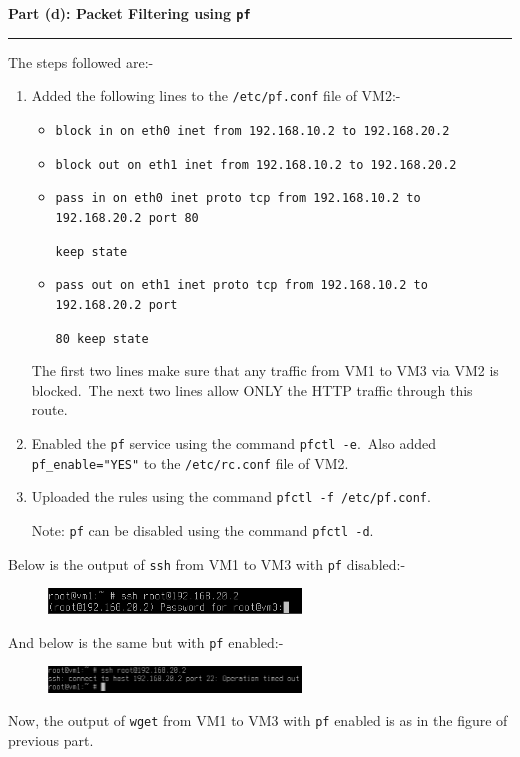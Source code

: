 \documentclass[a4paper,12pt]{article}
\newenvironment{solution}[2][]{%
\begin{mdframed}[linecolor=blue!70!black, linewidth=2pt, roundcorner=10pt, backgroundcolor=yellow!10!white, skipabove=12pt, skipbelow=12pt]%
	\textbf{\large #2}
	\par\noindent\rule{\textwidth}{0.4pt}
}{
\end{mdframed}
}
\begin{document}
\begin{solution}{Part (d): Packet Filtering using \texttt{pf}}
    The steps followed are:-
    \begin{enumerate}
        \item Added the following lines to the \texttt{/etc/pf.conf} file of VM2:-
        \begin{itemize}
            \item \texttt{block in on eth0 inet from 192.168.10.2 to 192.168.20.2}
            \item \texttt{block out on eth1 inet from 192.168.10.2 to 192.168.20.2}
            \item \texttt{pass in on eth0 inet proto tcp from 192.168.10.2 to 192.168.20.2 port 80}

            \texttt{keep state}
            \item \texttt{pass out on eth1 inet proto tcp from 192.168.10.2 to 192.168.20.2 port}

            \texttt{80 keep state}
        \end{itemize}
        The first two lines make sure that any traffic from VM1 to VM3 via VM2 is blocked.\ The next two lines allow ONLY the HTTP traffic through this route.
        \item Enabled the \texttt{pf} service using the command \texttt{pfctl -e}.\ Also added \texttt{pf\_enable="YES"} to the \texttt{/etc/rc.conf} file of VM2.
        \item Uploaded the rules using the command \texttt{pfctl -f /etc/pf.conf}.
        
        Note: \texttt{pf} can be disabled using the command \texttt{pfctl -d}.
    \end{enumerate}
    Below is the output of \texttt{ssh} from VM1 to VM3 with \texttt{pf} disabled:-
    \begin{figure}[H]
        \centering
        \includegraphics[width=0.6\textwidth]{ssh_with_no_pf.png}
    \end{figure}
    And below is the same but with \texttt{pf} enabled:-
    \begin{figure}[H]
        \centering
        \includegraphics[width=0.6\textwidth]{ssh_with_pf.png}
    \end{figure}
    Now, the output of \texttt{wget} from VM1 to VM3 with \texttt{pf} enabled is as in the figure of previous part.

\end{solution}
\end{document}
